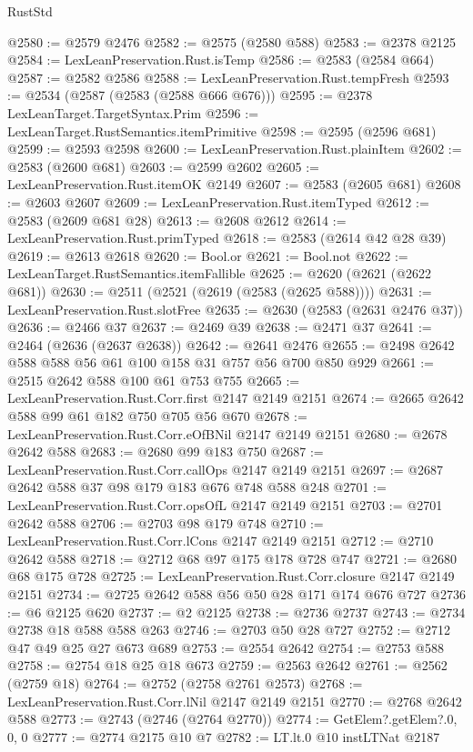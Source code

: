 \begin{lexlean}{RustStd}
\begin{coremodule}
{\begin{coremodule}
{{{{{{{{{{{{{{{@2580 := @2579 @2476
@2582 := @2575 (@2580 @588)
@2583 := @2378 @2125
@2584 := LexLeanPreservation.Rust.isTemp
@2586 := @2583 (@2584 @664)
@2587 := @2582 @2586
@2588 := LexLeanPreservation.Rust.tempFresh
@2593 := @2534 (@2587 (@2583 (@2588 @666 @676)))
@2595 := @2378 LexLeanTarget.TargetSyntax.Prim
@2596 := LexLeanTarget.RustSemantics.itemPrimitive
@2598 := @2595 (@2596 @681)
@2599 := @2593 @2598
@2600 := LexLeanPreservation.Rust.plainItem
@2602 := @2583 (@2600 @681)
@2603 := @2599 @2602
@2605 := LexLeanPreservation.Rust.itemOK @2149
@2607 := @2583 (@2605 @681)
@2608 := @2603 @2607
@2609 := LexLeanPreservation.Rust.itemTyped
@2612 := @2583 (@2609 @681 @28)
@2613 := @2608 @2612
@2614 := LexLeanPreservation.Rust.primTyped
@2618 := @2583 (@2614 @42 @28 @39)
@2619 := @2613 @2618
@2620 := Bool.or
@2621 := Bool.not
@2622 := LexLeanTarget.RustSemantics.itemFallible
@2625 := @2620 (@2621 (@2622 @681))
@2630 := @2511 (@2521 (@2619 (@2583 (@2625 @588))))
@2631 := LexLeanPreservation.Rust.slotFree
@2635 := @2630 (@2583 (@2631 @2476 @37))
@2636 := @2466 @37
@2637 := @2469 @39
@2638 := @2471 @37
@2641 := @2464 (@2636 (@2637 @2638))
@2642 := @2641 @2476
@2655 := @2498 @2642 @588 @588 @56 @61 @100 @158 @31 @757 @56 @700 @850 @929
@2661 := @2515 @2642 @588 @100 @61 @753 @755
@2665 := LexLeanPreservation.Rust.Corr.first @2147 @2149 @2151
@2674 := @2665 @2642 @588 @99 @61 @182 @750 @705 @56 @670
@2678 := LexLeanPreservation.Rust.Corr.eOfBNil @2147 @2149 @2151
@2680 := @2678 @2642 @588
@2683 := @2680 @99 @183 @750
@2687 := LexLeanPreservation.Rust.Corr.callOps @2147 @2149 @2151
@2697 := @2687 @2642 @588 @37 @98 @179 @183 @676 @748 @588 @248
@2701 := LexLeanPreservation.Rust.Corr.opsOfL @2147 @2149 @2151
@2703 := @2701 @2642 @588
@2706 := @2703 @98 @179 @748
@2710 := LexLeanPreservation.Rust.Corr.lCons @2147 @2149 @2151
@2712 := @2710 @2642 @588
@2718 := @2712 @68 @97 @175 @178 @728 @747
@2721 := @2680 @68 @175 @728
@2725 := LexLeanPreservation.Rust.Corr.closure @2147 @2149 @2151
@2734 := @2725 @2642 @588 @56 @50 @28 @171 @174 @676 @727
@2736 := @6 @2125 @620
@2737 := @2 @2125
@2738 := @2736 @2737
@2743 := @2734 @2738 @18 @588 @588 @263
@2746 := @2703 @50 @28 @727
@2752 := @2712 @47 @49 @25 @27 @673 @689
@2753 := @2554 @2642
@2754 := @2753 @588
@2758 := @2754 @18 @25 @18 @673
@2759 := @2563 @2642
@2761 := @2562 (@2759 @18)
@2764 := @2752 (@2758 @2761 @2573)
@2768 := LexLeanPreservation.Rust.Corr.lNil @2147 @2149 @2151
@2770 := @2768 @2642 @588
@2773 := @2743 (@2746 (@2764 @2770))
@2774 := GetElem?.getElem?.{0, 0, 0}
@2777 := @2774 @2175 @10 @7
@2782 := LT.lt.{0} @10 instLTNat @2187
}}}}}}}}}}}}}}}
\end{coremodule}}
\end{coremodule}
\end{lexlean}
